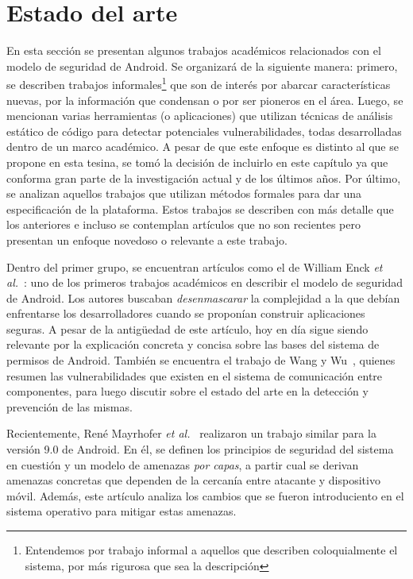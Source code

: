 
\chapter*{Estado del arte}
\label{chapter:estado}

En esta sección se presentan algunos trabajos académicos relacionados con el
modelo de seguridad de Android. Se organizará de la siguiente manera: primero,
se describen trabajos informales\footnote{Entendemos por trabajo informal a
aquellos que describen coloquialmente el sistema, por más rigurosa que sea la
descripción} que son de interés por abarcar características nuevas, por la
información que condensan o por ser pioneros en el área. Luego, se mencionan
varias herramientas (o aplicaciones) que utilizan técnicas de análisis estático
de código para detectar potenciales vulnerabilidades, todas desarrolladas dentro
de un marco académico. A pesar de que este enfoque  es distinto al que se
propone en esta tesina, se tomó la decisión de incluirlo en este capítulo ya que
conforma gran parte de la investigación actual y de los últimos años. Por
último, se analizan aquellos trabajos que utilizan métodos formales para dar una
especificación de la plataforma. Estos trabajos se describen con más detalle que
los anteriores e incluso se contemplan artículos que no son recientes pero
presentan un enfoque novedoso o relevante a este trabajo.

Dentro del primer grupo, se encuentran artículos como el de William Enck
\textit{et al.}~\cite{enck}: uno de los primeros trabajos académicos en
describir el modelo de seguridad de Android. Los autores buscaban
\textit{desenmascarar} la complejidad a la que debían enfrentarse los
desarrolladores cuando se proponían construir aplicaciones seguras. A pesar de
la antigüedad de este artículo, hoy en día sigue siendo relevante por la
explicación concreta y concisa sobre las bases del sistema de permisos de
Android. También se encuentra el trabajo de Wang y Wu~\cite{wang}, quienes
resumen las vulnerabilidades que existen en el sistema de comunicación entre
componentes, para luego discutir sobre el estado del arte en la detección y
prevención de las mismas.

Recientemente, René Mayrhofer \textit{et al.}~\cite{mayrhofer} realizaron un
trabajo similar para la versión 9.0 de Android. En él, se definen los principios
de seguridad del sistema en cuestión y un modelo de amenazas \textit{por capas},
a partir cual se derivan amenazas concretas que dependen de la cercanía entre
atacante y dispositivo móvil. Además, este artículo analiza los cambios que se
fueron introduciento en el sistema operativo para mitigar estas amenazas.

